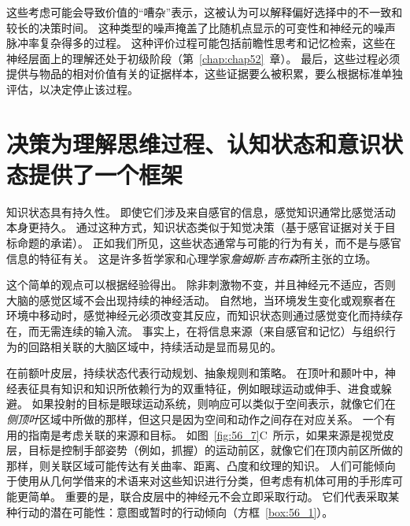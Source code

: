 这些考虑可能会导致价值的“嘈杂”表示，这被认为可以解释偏好选择中的不一致和较长的决策时间。
这种类型的噪声掩盖了比随机点显示的可变性和神经元的噪声脉冲率复杂得多的过程。
这种评价过程可能包括前瞻性思考和记忆检索，这些在神经层面上的理解还处于初级阶段（第~\ref{chap:chap52}~章）。
最后，这些过程必须提供与物品的相对价值有关的证据样本，这些证据要么被积累，要么根据标准单独评估，以决定停止该过程。



\section{决策为理解思维过程、认知状态和意识状态提供了一个框架}

知识状态具有持久性。
即使它们涉及来自感官的信息，感觉知识通常比感觉活动本身更持久。
通过这种方式，知识状态类似于知觉决策（基于感官证据对关于目标命题的承诺）。
正如我们所见，这些状态通常与可能的行为有关，而不是与感官信息的特征有关。
这是许多哲学家和心理学家\textit{詹姆斯$\cdot$吉布森}所主张的立场。


这个简单的观点可以根据经验得出。
除非刺激物不变，并且神经元不适应，否则大脑的感觉区域不会出现持续的神经活动。
自然地，当环境发生变化或观察者在环境中移动时，感觉神经元必须改变其反应，而知识状态则通过感觉变化而持续存在，而无需连续的输入流。
事实上，在将信息来源（来自感官和记忆）与组织行为的回路相关联的大脑区域中，持续活动是显而易见的。


在前额叶皮层，持续状态代表行动规划、抽象规则和策略。
在顶叶和颞叶中，神经表征具有知识和知识所依赖行为的双重特征，例如眼球运动或伸手、进食或躲避。
如果投射的目标是眼球运动系统，则响应可以类似于空间表示，就像它们在\textit{侧顶叶}区域中所做的那样，但这只是因为空间和动作之间存在对应关系。
一个有用的指南是考虑关联的来源和目标。
如图~\ref{fig:56_7}C~所示，如果来源是视觉皮层，目标是控制手部姿势（例如，抓握）的运动前区，就像它们在顶内前区所做的那样，则关联区域可能传达有关曲率、距离、凸度和纹理的知识。
人们可能倾向于使用从几何学借来的术语来对这些知识进行分类，但考虑有机体可用的手形库可能更简单。
重要的是，联合皮层中的神经元不会立即采取行动。
它们代表采取某种行动的潜在可能性：意图或暂时的行动倾向（方框~\ref{box:56_1}）。


